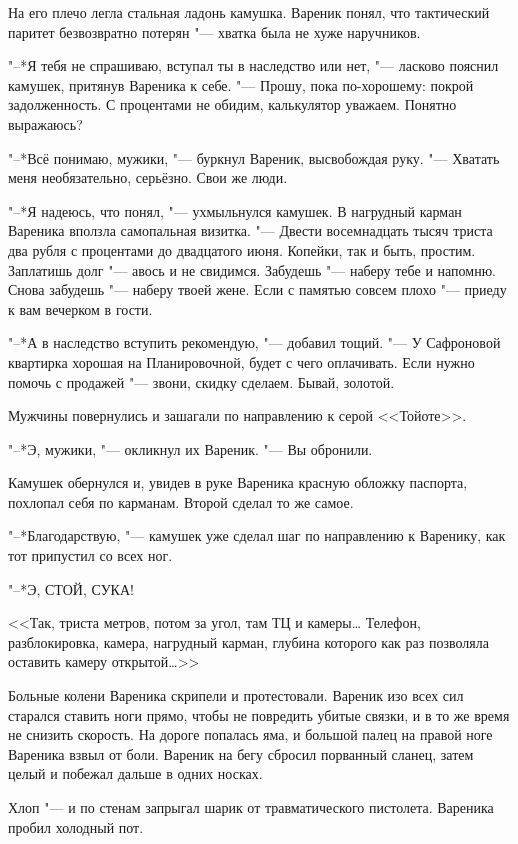 На его плечо легла стальная ладонь камушка.
Вареник понял, что тактический паритет безвозвратно потерян "--- хватка была не хуже наручников.

"--*Я тебя не спрашиваю, вступал ты в наследство или нет, "--- ласково пояснил камушек, притянув Вареника к себе.
"--- Прошу, пока по-хорошему: покрой задолженность.
С процентами не обидим, калькулятор уважаем.
Понятно выражаюсь?

"--*Всё понимаю, мужики, "--- буркнул Вареник, высвобождая руку.
"--- Хватать меня необязательно, серьёзно.
Свои же люди.

"--*Я надеюсь, что понял, "--- ухмыльнулся камушек.
В нагрудный карман Вареника вползла самопальная визитка.
"--- Двести восемнадцать тысяч триста два рубля с процентами до двадцатого июня.
Копейки, так и быть, простим.
Заплатишь долг "--- авось и не свидимся.
Забудешь "--- наберу тебе и напомню.
Снова забудешь "--- наберу твоей жене.
Если с памятью совсем плохо "--- приеду к вам вечерком в гости.

"--*А в наследство вступить рекомендую, "--- добавил тощий.
"--- У Сафроновой квартирка хорошая на Планировочной, будет с чего оплачивать.
Если нужно помочь с продажей "--- звони, скидку сделаем.
Бывай, золотой.

Мужчины повернулись и зашагали по направлению к серой <<Тойоте>>.

"--*Э, мужики, "--- окликнул их Вареник.
"--- Вы обронили.

Камушек обернулся и, увидев в руке Вареника красную обложку паспорта, похлопал себя по карманам.
Второй сделал то же самое.

"--*Благодарствую, "--- камушек уже сделал шаг по направлению к Варенику, как тот припустил со всех ног.

"--*Э, СТОЙ, СУКА!

<<Так, триста метров, потом за угол, там ТЦ и камеры\ldots{}
Телефон, разблокировка, камера, нагрудный карман, глубина которого как раз позволяла оставить камеру открытой\ldots{}>>

Больные колени Вареника скрипели и протестовали.
Вареник изо всех сил старался ставить ноги прямо, чтобы не повредить убитые связки, и в то же время не снизить скорость.
На дороге попалась яма, и большой палец на правой ноге Вареника взвыл от боли.
Вареник на бегу сбросил порванный сланец, затем целый и побежал дальше в одних носках.

Хлоп "--- и по стенам запрыгал шарик от травматического пистолета.
Вареника пробил холодный пот.

